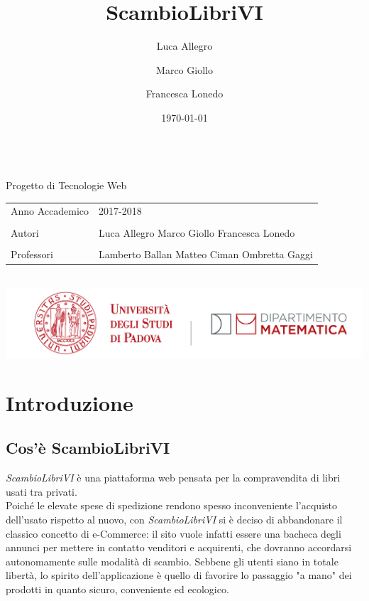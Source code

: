 \documentclass[openany,10pt,a4paper]{article}
\title{ScambioLibriVI}
\author{Luca Allegro \and Marco Giollo \and Francesca Lonedo}
\date{\today}
\begin{document}
	\makeatletter
	\begin{titlepage}
		\begin{center}
			

			{\Huge \bfseries  \@title }\\[5em]
			\vfill
			{\Large Progetto di Tecnologie Web} \\[2em]
			\begin{tabular}{ p{5cm} | p{5cm} }
				Anno Accademico & 2017-2018 \\
				\\
				Autori & Luca Allegro \newline Marco Giollo \newline Francesca Lonedo \\
				\\
				Professori & Lamberto Ballan \newline Matteo Ciman \newline Ombretta Gaggi  \\
			\end{tabular}\\[3 em]
			\vfill
			{\large \@date}
			\vfill
			\includegraphics[height=2 cm]{header_dipartimento_matematica.png}\\[3em]
		\end{center}
	\end{titlepage}


	
	


	\newpage

	\tableofcontents
	\newpage

\section{Introduzione}
	\subsection{Cos'è ScambioLibriVI}
		\textit{ScambioLibriVI} è una piattaforma web pensata per la compravendita di libri usati tra privati. \\
		Poiché le elevate spese di spedizione rendono spesso inconveniente l'acquisto dell'usato rispetto al nuovo, con \textit{ScambioLibriVI} si è deciso di abbandonare il classico concetto di e-Commerce: il sito vuole infatti essere una bacheca degli annunci per mettere in contatto venditori e acquirenti, che dovranno accordarsi autonomamente sulle modalità di scambio. Sebbene gli utenti siano in totale libertà, lo spirito dell'applicazione è quello di favorire lo passaggio "a mano" dei prodotti in quanto sicuro, conveniente ed ecologico.
\end{document}

